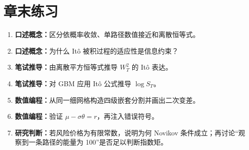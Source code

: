\section{章末练习}
\begin{enumerate}
  \item \textbf{口述概念：}区分依概率收敛、单路径数值接近和离散恒等式。
  \item \textbf{口述概念：}为什么 Itô 被积过程的适应性是信息约束？
  \item \textbf{笔试推导：}由离散平方恒等式推导 $W_T^2$ 的 Itô 表达。
  \item \textbf{笔试推导：}对 GBM 应用 Itô 公式推导 $\log S_T$。
  \item \textbf{数值编程：}从同一细网格构造四级嵌套分割并画出二次变差。
  \item \textbf{数值编程：}验证 $\mu-\sigma\theta=r$，再注入错误符号。
  \item \textbf{研究判断：}若风险价格为有限常数，说明为何 Novikov 条件成立；再讨论“观察到一条路径的能量为 100”是否足以判断指数矩。
\end{enumerate}


\MFQMappedDerivativesStochasticQuestions
